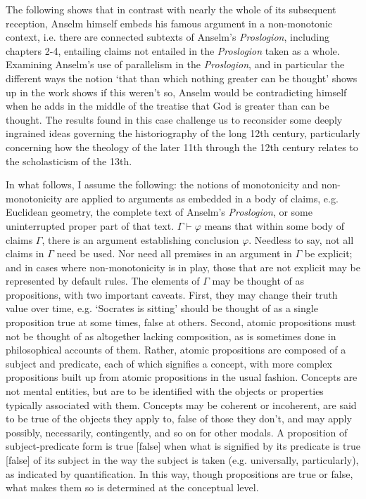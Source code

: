\documentclass[]{birkjour}
\begin{document}
The following shows that in contrast with nearly the whole of its subsequent reception, Anselm himself embeds his famous argument in a non-monotonic context, i.e. there are connected subtexts of Anselm's \textit{Proslogion}, including chapters 2-4, entailing claims not entailed in the \textit{Proslogion} taken as a whole. Examining Anselm's use of parallelism in the \textit{Proslogion}, and in particular the different ways the notion `that than which nothing greater can be thought' shows up in the work shows if this weren't so, Anselm would be contradicting himself when he adds in the middle of the treatise that God is greater than can be thought.  The results found in this case challenge us to reconsider some deeply ingrained ideas governing the historiography of the long 12th century, particularly concerning how the theology of the later 11th through the 12th century relates to the scholasticism of the 13th.

In what follows, I assume the following: the notions of monotonicity and non-monotonicity are applied to arguments as embedded in a body of claims, e.g. Euclidean geometry, the complete text of Anselm's \textit{Proslogion}, or some uninterrupted proper part of that text. $\Gamma \vdash \varphi$ means that within some body of claims $\Gamma$, there is an argument establishing conclusion $\varphi$. Needless to say, not all claims in $\Gamma$ need be used. Nor need all premises in an argument in $\Gamma$ be explicit; and in cases where non-monotonicity is in play, those that are not explicit may be represented by default rules. The elements of $\Gamma$ may be thought of as propositions, with two important caveats. First, they may change their truth value over time, e.g. `Socrates is sitting' should be thought of as a single proposition true at some times, false at others. Second, atomic propositions must not be thought of as altogether lacking composition, as is sometimes done in philosophical accounts of them. Rather, atomic propositions are composed of a subject and predicate, each of which signifies a concept, with more complex propositions built up from atomic propositions in the usual fashion. Concepts are not mental entities, but are to be identified with the objects or properties typically associated with them. Concepts may be coherent or incoherent, are said to be true of the objects they apply to, false of those they don't, and may apply possibly, necessarily, contingently, and so on for other modals. A proposition of subject-predicate form is true [false] when what is signified by its predicate is true [false] of its subject in the way the subject is taken (e.g. universally, particularly), as indicated by quantification. In this way, though propositions are true or false, what makes them so is determined at the conceptual level.
\end{document}
